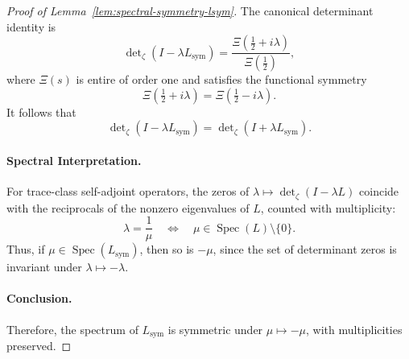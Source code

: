 \begin{proof}[Proof of Lemma~\ref{lem:spectral-symmetry-lsym}]
The canonical determinant identity is
\[
\det\nolimits_{\zeta}(I - \lambda L_{\mathrm{sym}}) = \frac{\Xi(\tfrac{1}{2} + i\lambda)}{\Xi(\tfrac{1}{2})},
\]
where \( \Xi(s) \) is entire of order one and satisfies the functional symmetry
\[
\Xi\left(\tfrac{1}{2} + i\lambda\right) = \Xi\left(\tfrac{1}{2} - i\lambda\right).
\]
It follows that
\[
\det\nolimits_{\zeta}(I - \lambda L_{\mathrm{sym}}) = \det\nolimits_{\zeta}(I + \lambda L_{\mathrm{sym}}).
\]

\paragraph{Spectral Interpretation.}
For trace-class self-adjoint operators, the zeros of \( \lambda \mapsto \det\nolimits_{\zeta}(I - \lambda L) \) coincide with the reciprocals of the nonzero eigenvalues of \( L \), counted with multiplicity:
\[
\lambda = \frac{1}{\mu} \quad \Longleftrightarrow \quad \mu \in \operatorname{Spec}(L) \setminus \{0\}.
\]
Thus, if \( \mu \in \operatorname{Spec}(L_{\mathrm{sym}}) \), then so is \( -\mu \), since the set of determinant zeros is invariant under \( \lambda \mapsto -\lambda \).

\paragraph{Conclusion.}
Therefore, the spectrum of \( L_{\mathrm{sym}} \) is symmetric under \( \mu \mapsto -\mu \), with multiplicities preserved.
\end{proof}
